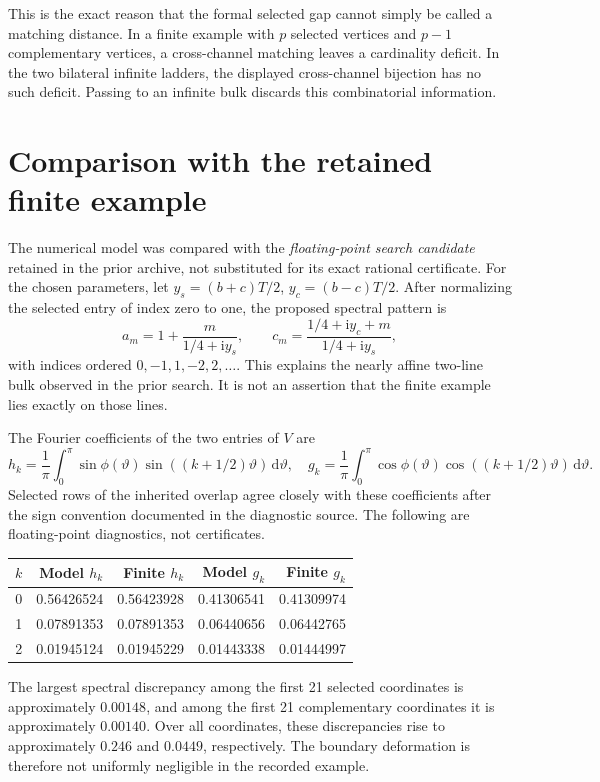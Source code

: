 \documentclass[11pt]{article}
\theoremstyle{remark}
\newcommand{\dd}{\,\mathrm{d}}
\newcommand{\ii}{\mathrm{i}}
\begin{document}
This is the exact reason that the formal selected gap cannot simply be called a matching distance. In a finite example with $p$ selected vertices and $p-1$ complementary vertices, a cross-channel matching leaves a cardinality deficit. In the two bilateral infinite ladders, the displayed cross-channel bijection has no such deficit. Passing to an infinite bulk discards this combinatorial information.

\section{Comparison with the retained finite example}
The numerical model was compared with the \emph{floating-point search candidate} retained in the prior archive, not substituted for its exact rational certificate. For the chosen parameters, let $y_s=(b+c)T/2$, $y_c=(b-c)T/2$. After normalizing the selected entry of index zero to one, the proposed spectral pattern is
\[
 a_m=1+\frac{m}{1/4+\ii y_s},\qquad
 c_m=\frac{1/4+\ii y_c+m}{1/4+\ii y_s},
\]
with indices ordered $0,-1,1,-2,2,\ldots$. This explains the nearly affine two-line bulk observed in the prior search. It is not an assertion that the finite example lies exactly on those lines.

The Fourier coefficients of the two entries of $V$ are
\[
 h_k=\frac1\pi\int_0^\pi\sin\phi(\vartheta)
             \sin((k+1/2)\vartheta)\dd\vartheta,\quad
 g_k=\frac1\pi\int_0^\pi\cos\phi(\vartheta)
             \cos((k+1/2)\vartheta)\dd\vartheta.
\]
Selected rows of the inherited overlap agree closely with these coefficients after the sign convention documented in the diagnostic source. The following are floating-point diagnostics, not certificates.
\begin{center}
\begin{tabular}{rrrrr}
\toprule
$k$&Model $h_k$&Finite $h_k$&Model $g_k$&Finite $g_k$\\\midrule
0&0.56426524&0.56423928&0.41306541&0.41309974\\
1&0.07891353&0.07891353&0.06440656&0.06442765\\
2&0.01945124&0.01945229&0.01443338&0.01444997\\\bottomrule
\end{tabular}
\end{center}
The largest spectral discrepancy among the first 21 selected coordinates is approximately $0.00148$, and among the first 21 complementary coordinates it is approximately $0.00140$. Over all coordinates, these discrepancies rise to approximately $0.246$ and $0.0449$, respectively. The boundary deformation is therefore not uniformly negligible in the recorded example.
\end{document}
